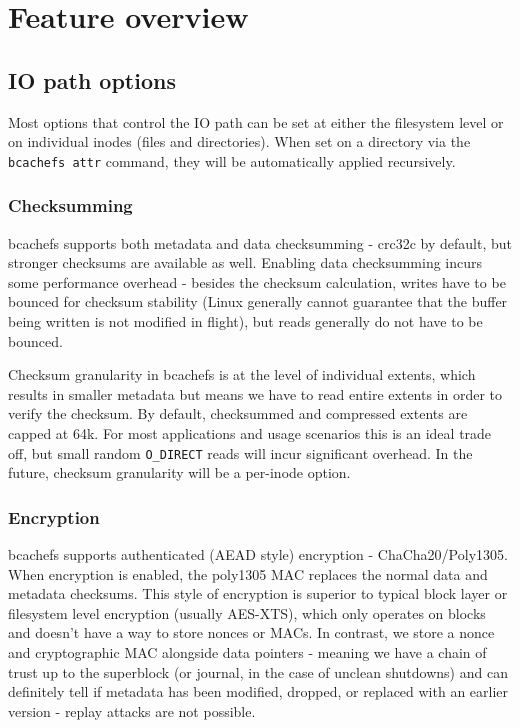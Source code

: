 \documentclass{article}
\begin{document}
\section{Feature overview}

\subsection{IO path options}

Most options that control the IO path can be set at either the filesystem level
or on individual inodes (files and directories). When set on a directory via the
\texttt{bcachefs attr} command, they will be automatically applied recursively.

\subsubsection{Checksumming}

bcachefs supports both metadata and data checksumming - crc32c by default, but
stronger checksums are available as well. Enabling data checksumming incurs some
performance overhead - besides the checksum calculation, writes have to be
bounced for checksum stability (Linux generally cannot guarantee that the buffer
being written is not modified in flight), but reads generally do not have to be
bounced.

Checksum granularity in bcachefs is at the level of individual extents, which
results in smaller metadata but means we have to read entire extents in order to
verify the checksum. By default, checksummed and compressed extents are capped
at 64k. For most applications and usage scenarios this is an ideal trade off, but
small random \texttt{O\_DIRECT} reads will incur significant overhead. In the
future, checksum granularity will be a per-inode option.

\subsubsection{Encryption}

bcachefs supports authenticated (AEAD style) encryption - ChaCha20/Poly1305.
When encryption is enabled, the poly1305 MAC replaces the normal data and
metadata checksums. This style of encryption is superior to typical block layer
or filesystem level encryption (usually AES-XTS), which only operates on blocks
and doesn't have a way to store nonces or MACs. In contrast, we store a nonce
and cryptographic MAC alongside data pointers - meaning we have a chain of trust
up to the superblock (or journal, in the case of unclean shutdowns) and can
definitely tell if metadata has been modified, dropped, or replaced with an
earlier version - replay attacks are not possible.
\end{document}
